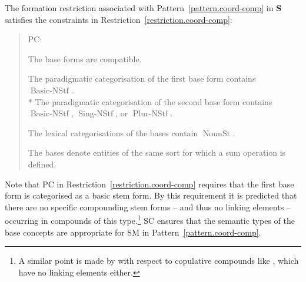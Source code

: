 \documentclass[output=paper
  ,nobabel
  ,draftmode
  ,colorlinks, citecolor=brown
]{langscibook}
\begin{document}
The formation restriction associated with Pattern \ref{pattern.coord-comp} in $\mathbf{S}$ satisfies
the constraints in Restriction \ref{restriction.coord-comp}:
\pagebreak[2]
\begin{quotation}
\begin{restriction}
\label{restriction.coord-comp}\vspace{-1.25\baselineskip}
\begin{labeledlist}{PC:}
\item[FC:] \raggedright The base forms are compatible.
\item[PC:] \raggedright The paradigmatic categorisation of the first base form contains $\operatorname{Basic-NStf}$.\\*{}
The paradigmatic categorisation of the second base form contains $\operatorname{Basic-NStf}$, $\operatorname{Sing-NStf}$, or $\operatorname{Plur-NStf}$.
\item[LC:] \raggedright The lexical categorisations of the bases contain $\operatorname{NounSt}$.
\item[SC:] \raggedright The bases denote entities of the same sort for which a sum operation is
defined.
\end{labeledlist}
\end{restriction}
\end{quotation}
Note that PC in Restriction \ref{restriction.coord-comp} requires that the first base form is
categorised as a basic stem form. By this requirement it is predicted that there
are no specific compounding stem forms – and thus no linking elements –
occurring in compounds of this type.\footnote{A similar point is made by \citet[29]{becker:1992:compounding:german} with respect to
copulative compounds like \emph{}, which have no linking elements
either.} SC ensures that the semantic types of the base concepts are
appropriate for SM in Pattern \ref{pattern.coord-comp}.
\end{document}
